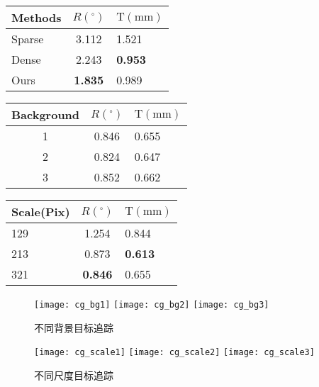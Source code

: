 \begin{table}[t]
    \begin{minipage}[c]{0.3\linewidth}
        \centering
        \label{table:chap05:tracking_methods_error}
           \begin{tabular}{lcl}
               \toprule
               Methods & $R(^\circ)$ & $\textrm{T}(\textrm{mm})$   \\
               \midrule
               Sparse   & 3.112 & 1.521\\ 
               Dense    & 2.243 & \textbf{0.953}\\ 
               Ours    & \textbf{1.835} & 0.989\\ 
               \bottomrule
           \end{tabular}
    \end{minipage}
    \hfill
    \begin{minipage}[c]{0.3\linewidth}
        \centering
        \label{table:chap05:chagne_background}
           \begin{tabular}{ccl}
               \toprule
               Background & $R(^\circ)$ & $\textrm{T}(\textrm{mm})$   \\
               \midrule
               1   & 0.846 & 0.655\\ 
               2    & 0.824 & 0.647\\ 
               3    & 0.852 & 0.662\\ 
               \bottomrule
           \end{tabular}
    \end{minipage}
    \hfill
    \begin{minipage}[c]{0.3\linewidth}
        \centering
         \label{table:chap05:cg_track_jdu}
            \begin{tabular}{lcl}
                \toprule
                Scale(Pix) & $R(^\circ)$ & $\textrm{T}(\textrm{mm})$   \\
                \midrule
                129   & 1.254 & 0.844\\ 
                213    & 0.873 & \textbf{0.613}\\ 
                321    & \textbf{0.846} & 0.655\\ 
                \bottomrule
            \end{tabular}
      \end{minipage}%
  \end{table}
  \begin{figure}[t] %
    \centering%
      \texttt{[image: cg\_bg1]}
      \texttt{[image: cg\_bg2]}
      \texttt{[image: cg\_bg3]}
    \caption{不同背景目标追踪}
      \label{fig:chap05:diff_back_track}
  \end{figure}
  \begin{figure}[t] %
    \centering%
      \texttt{[image: cg\_scale1]}
      \texttt{[image: cg\_scale2]}
      \texttt{[image: cg\_scale3]}
    \caption{不同尺度目标追踪}
      \label{fig:chap05:scale_track_res}
  \end{figure}

